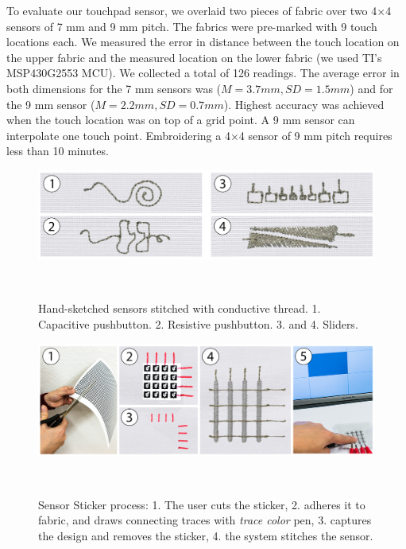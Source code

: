 \documentclass[header.tex]{subfiles}
\begin{document}
To evaluate our touchpad sensor, we overlaid two pieces of fabric over two 4$\times$4 sensors of 7 mm and 9 mm pitch. The fabrics were pre-marked with 9 touch locations each. We measured the error in distance between the touch location on the upper fabric and the measured location on the lower fabric (we used TI's MSP430G2553 MCU). We collected a total of 126 readings. The average error in both dimensions for the 7 mm sensors was ($M = 3.7 mm , SD = 1.5 mm$) and for the 9 mm sensor ($M = 2.2 mm, SD = 0.7 mm$).  Highest accuracy was achieved when the touch location was on top of a grid point. A 9 mm sensor can interpolate one touch point. Embroidering a 4$\times$4 sensor of 9 mm pitch requires less than 10 minutes.

\begin{figure}[t]
\centering
  \includegraphics[width=1\columnwidth]{figures/PushButtons_Sliders.png}
  \caption{Hand-sketched sensors stitched with conductive thread. 1. Capacitive pushbutton. 2. Resistive pushbutton. 3. and 4. Sliders.}~\label{fig:PushButtons_Sliders}
  \vspace{-2.2em}
\end{figure}

\begin{figure}[h]
\centering
  \includegraphics[width=1.0\columnwidth]{figures/Touchpad.png}
  \caption{Sensor Sticker process: 1. The user cuts the sticker, 2. adheres it to fabric, and draws connecting traces with \textit{trace color} pen, 3. captures the design and removes the sticker, 4. the system stitches the sensor.}~\label{fig:Touchpad}
  \vspace{-1.8em}
  \end{figure}
\end{document}
